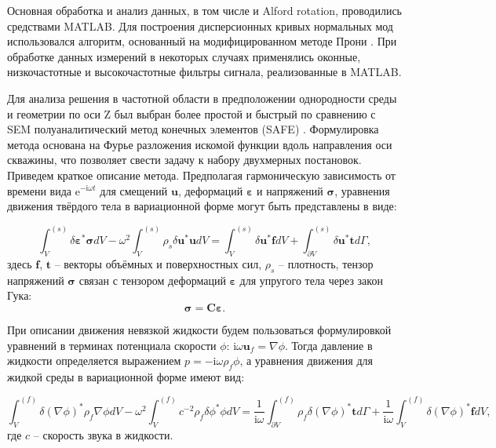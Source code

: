 \documentclass[a4paper,11pt]{article}
\newcommand{\ii}{\mathrm{i}}
\begin{document}
Основная обработка и анализ данных, в том числе и Alford rotation, проводились средствами MATLAB. Для построения дисперсионных кривых нормальных мод использовался алгоритм, основанный на модифицированном методе Прони \cite{Ekstrom1995}. При обработке данных измерений в некоторых случаях применялись оконные, низкочастотные и высокочастотные фильтры сигнала, реализованные в MATLAB. 

Для анализа решения в частотной области в предположении однородности среды и геометрии по оси Z был выбран более простой и быстрый по сравнению с SEM полуаналитический метод конечных элементов (SAFE) \cite{Bartoli2006}. Формулировка метода основана на Фурье разложения искомой функции вдоль направления оси скважины, что позволяет свести задачу к набору двухмерных постановок. Приведем краткое описание метода. Предполагая гармоническую зависимость от времени вида $\mathrm{e}^{-\ii\omega t}$ для смещений $\mathbf{u}$, деформаций $\boldsymbol{\varepsilon}$ и напряжений $\boldsymbol{\sigma}$, уравнения движения твёрдого тела в вариационной форме могут быть представлены в виде:

\begin{equation}
\int_{V}^{(s)}\delta \boldsymbol{\varepsilon}^* \boldsymbol{\sigma} dV - \omega^2 \int_{V}^{(s)} \rho_s \delta \mathbf{u}^*\mathbf{u}dV = \int_{V}^{(s)}\delta \mathbf{u}^* \mathbf{f} dV + \int_{\partial V}^{(s)}\delta \mathbf{u}^* \mathbf{t} d\Gamma, \label{var_eq_solid}
\end{equation}
здесь $\mathbf{f}$, $\mathbf{t}$ -- векторы объёмных и поверхностных сил, $\rho_s$ -- плотность, тензор напряжений $\boldsymbol{\sigma}$ связан с тензором деформаций $\boldsymbol{\varepsilon}$ для упругого тела через закон Гука:
$$
\boldsymbol{\sigma} = \mathbf{C}\boldsymbol{\varepsilon}.
$$

При описании движения невязкой жидкости будем пользоваться формулировкой уравнений в терминах потенциала скорости $\phi$: $\ii \omega \mathbf{u}_f = \nabla \phi$. Тогда давление в жидкости определяется выражением $p = -\ii \omega \rho_f \phi$, а уравнения движения для жидкой среды в вариационной форме имеют вид: 

\begin{equation}
\int_{V}^{(f)} \delta (\nabla\phi)^* \rho_f  \nabla \phi dV - \omega^2 \int_{V}^{(f)}  c^{-2} \rho_f \delta \phi^*  \phi dV = \frac{1}{\ii\omega}\int_{\partial V}^{(f)} \rho_f \delta(\nabla \phi)^* \mathbf{t} d\Gamma + \frac{1}{\ii\omega} \int_{V}^{(f)} \delta(\nabla \phi)^* \mathbf{f} dV, \label{var_eq_fluid}
\end{equation}
где $c$ -- скорость звука в жидкости.
\end{document}
